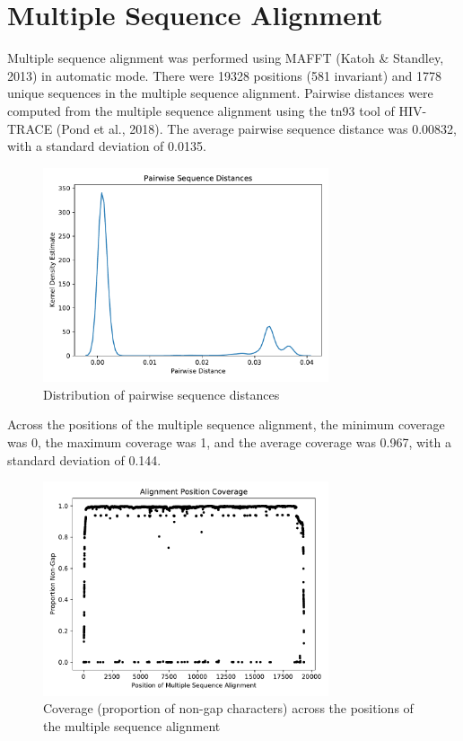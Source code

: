 \documentclass{article}
\begin{document}
\section{Multiple Sequence Alignment}
Multiple sequence alignment was performed using MAFFT (Katoh \& Standley, 2013) in automatic mode. There were 19328 positions (581 invariant) and 1778 unique sequences in the multiple sequence alignment. Pairwise distances were computed from the multiple sequence alignment using the tn93 tool of HIV-TRACE (Pond et al., 2018). The average pairwise sequence distance was 0.00832, with a standard deviation of 0.0135.

\begin{figure}[h]
\centering
\includegraphics[width=0.75\textwidth,keepaspectratio]{./figs/pairwise_distances_sequences.pdf}
\caption{Distribution of pairwise sequence distances}
\end{figure}

Across the positions of the multiple sequence alignment, the minimum coverage was 0, the maximum coverage was 1, and the average coverage was 0.967, with a standard deviation of 0.144.

\begin{figure}[h]
\centering
\includegraphics[width=0.75\textwidth,keepaspectratio]{./figs/alignment_coverage.pdf}
\caption{Coverage (proportion of non-gap characters) across the positions of the multiple sequence alignment}
\end{figure}
\end{document}
